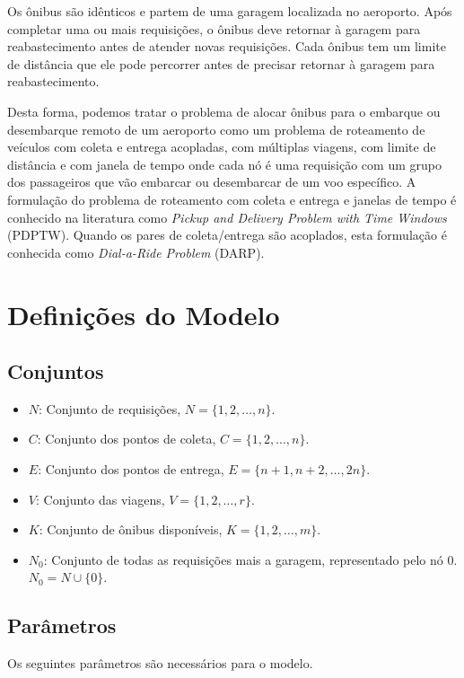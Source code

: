 \documentclass[12pt, a4paper]{article}
\begin{document}
Os ônibus são idênticos e partem de uma garagem localizada no aeroporto. Após completar uma ou mais requisições, o ônibus deve retornar à garagem para reabastecimento antes de atender novas requisições. Cada ônibus tem um limite de distância que ele pode percorrer antes de precisar retornar à garagem para reabastecimento.

Desta forma, podemos tratar o problema de alocar ônibus para o embarque ou desembarque remoto de um aeroporto como um problema de roteamento de veículos com coleta e entrega acopladas, com múltiplas viagens, com limite de distância e com janela de tempo onde cada nó é uma requisição com um grupo dos passageiros que vão embarcar ou desembarcar de um voo específico. A formulação do problema de roteamento com coleta e entrega e janelas de tempo é conhecido na literatura como \textit{Pickup and Delivery Problem with Time Windows} (PDPTW). Quando os pares de coleta/entrega são acoplados, esta formulação é conhecida como \textit{Dial-a-Ride Problem} (DARP).

\section{Definições do Modelo}

\subsection{Conjuntos}
\begin{itemize}
    \item $N$: Conjunto de requisições, $N = \{1, 2, \dots, n\}$.
    \item $C$: Conjunto dos pontos de coleta, $C = \{1, 2, \dots, n\}$.
    \item $E$: Conjunto dos pontos de entrega, $E = \{n+1, n+2, \dots, 2n\}$.
    \item $V$: Conjunto das viagens, $V = \{1, 2, \dots, r\}$.
    \item $K$: Conjunto de ônibus disponíveis, $K = \{1, 2, \dots, m\}$.
    \item $N_0$: Conjunto de todas as requisições mais a garagem, representado pelo nó $0$. $N_0 = N \cup \{0\}$.
\end{itemize}

\subsection{Parâmetros}

Os seguintes parâmetros são necessários para o modelo.
\end{document}
